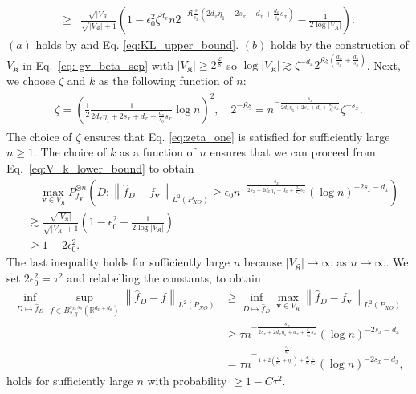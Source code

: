 \documentclass[11pt]{article}
\newcommand{\bv}{\mathbf v}
\newcommand{\calL}{\mathcal{L}}
\newcommand{\R}{\mathbb{R}}
\newcommand{\0}{\mathbf{0}}
\begin{document}
\begin{appendix}
\begin{align}
    \geq & \frac{\sqrt{|V_\mathfrak{K}|}}{\sqrt{|V_\mathfrak{K}|} + 1} \left( 1 - \epsilon_0^2 \zeta^{d_x} n 
    2^{-\mathfrak{K}\frac{\underline{s}}{s_x}\left(2d_x\eta_1 + 2s_x + d_x + \frac{d_o}{s_o}s_x\right)} -\frac{1}{2 \log |V_\mathfrak{K}|}\right). \label{eq:V_k_lower_bound}
\end{align}
$(a)$ holds by \citet[Theorem 20]{fischer2020sobolev} and Eq. \eqref{eq:KL_upper_bound}. $(b)$ holds by the construction of $V_\mathfrak{K}$ in Eq.~\eqref{eq: gv_beta_sep} with $|V_\mathfrak{K}|\geq 2^{\frac{\calL}{8}}$ so $\log |V_\mathfrak{K}|\gtrsim \zeta^{-d_x}2^{\mathfrak{K}\underline{s}(\frac{d_x}{s_x} + \frac{d_o}{s_o})}$. Next, we choose $\zeta$ and $k$ as the following function of $n$:
\begin{align}
\begin{aligned}
\label{eq:choice_k_lb}
    \zeta = \left( \frac{1}{2} \frac{1}{2d_x\eta_1 + 2s_x + d_x + \frac{d_o}{s_o} s_x} \log n\right)^2, \quad 2^{-\mathfrak{K}\underline{s}} = n^{-\frac{s_x}{2d_x\eta_1 + 2s_x + d_x + \frac{d_o}{s_o} s_x}} \zeta^{-s_x} .
\end{aligned}
\end{align}
The choice of $\zeta$ ensures that Eq. \eqref{eq:zeta_one} is satisfied for sufficiently large $n\geq 1$. 
The choice of $k$ as a function of $n$ ensures that we can proceed from Eq.~\eqref{eq:V_k_lower_bound} to obtain
\begin{align*}
    &\quad \max _{\bv \in V_\mathfrak{K}} P_{f_\bv}^{\otimes n} \left(D: \left\| \hat{f}_D - f_{\bv} \right\|_{L^2(P_{XO})} \geq \epsilon_0 n^{-\frac{s_x}{2s_x + 2d_x\eta_1 + d_x + \frac{d_o}{s_o}s_x}} (\log n)^{-2s_x - d_x} \right) \\
    &\gtrsim \frac{\sqrt{|V_\mathfrak{K}|}}{\sqrt{|V_\mathfrak{K}|} + 1} \left( 1 - \epsilon_0^2 - \frac{1}{2 \log |V_\mathfrak{K}|}\right) \\
    &\geq 1 - 2 \epsilon_0^2.
\end{align*}
The last inequality holds for sufficiently large $n$ because $ |V_\mathfrak{K}| \to \infty$ as $n \to \infty$.
We set $2\epsilon_0^2 = \tau^2$ and relabelling the constants, to obtain
\begin{align*}
    \inf_{D \mapsto \hat{f}_D} \sup_{f \in B_{2,q}^{s_x,s_o}\left(\R^{d_x+d_o}\right)} \left\| \hat{f}_D - f \right\|_{L^2(P_{XO})} &\geq \inf_{D \mapsto \hat{f}_D} \max_{\bv \in V_\mathfrak{K}} \left\| \hat{f}_D - f_{\bv}\right\|_{L^2(P_{XO})} \\
    &\geq \tau n^{-\frac{s_x}{2s_x + 2d_x\eta_1 + d_x + \frac{d_o}{s_o}s_x}} (\log n)^{-2s_x - d_x} \\
    &= \tau n^{-\frac{\frac{s_x}{d_x}}{1+2(\frac{s_x}{d_x}+\eta_1)+\frac{d_o}{s_o}\frac{s_x}{d_x}}} (\log n)^{-2s_x - d_x} ,
\end{align*}
holds for sufficiently large $n$ with probability $\geq 1 - C \tau^2$.


\end{appendix}
\end{document}
